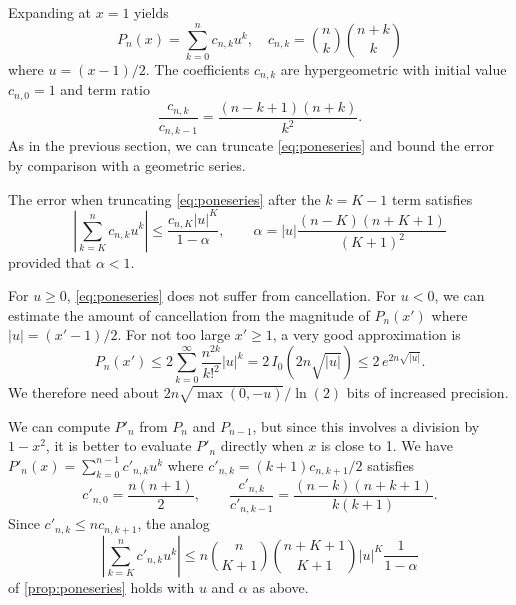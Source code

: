 \documentclass[nohypdvips,review]{siamart0216}
\begin{document}
\label{sec:series-one}

Expanding at $x = 1$ yields
\begin{equation}
\label{eq:poneseries}
P_n(x) = \sum_{k=0}^n c_{n,k} u^k, \quad c_{n,k} = {n \choose k} {n+k \choose k}
\end{equation}
where $u = (x-1)/2$.
The coefficients $c_{n,k}$ are hypergeometric with initial value $c_{n,0} = 1$
and term ratio
\begin{equation}
\label{eq:poneprec}
\frac{c_{n,k}}{c_{n,k-1}} = \frac{(n-k+1)(n+k)}{k^2}.
\end{equation}
As in the previous section, we can truncate \cref{eq:poneseries} and
bound the error by comparison with a geometric series.

\begin{proposition}
\label{prop:poneseries}
The error when truncating \cref{eq:poneseries} after the $k = K - 1$ term satisfies
\begin{equation}
\label{eq:truncerr2}
\left| \sum_{k=K}^n c_{n,k} u^k \right| \le \frac{c_{n,K} |u|^K}{1-\alpha},
\qquad \alpha = |u| \frac{(n-K)(n+K+1)}{(K+1)^2}
\end{equation}
provided that $\alpha < 1$.
\end{proposition}

For $u \ge 0$, \cref{eq:poneseries} does not suffer from cancellation.
For $u < 0$, we can estimate the amount of
cancellation from the magnitude of $P_n(x')$ where $|u| = (x'-1)/2$.
For not too large $x' \ge 1$, a very good approximation is
\[ P_n(x') \leq 2 \sum_{k=0}^{\infty} \frac{n^{2k}}{k!^2} |u|^k
           = 2\,I_0(2n\sqrt{|u|})
           \leq 2\,e^{2n\sqrt{|u|}}. \]
We therefore need about $2n\sqrt{\max(0,-u)} / \ln(2)$ bits
of increased precision.

We can compute $P'_n$ from $P_n$ and $P_{n-1}$, but since this
involves a division by $1-x^2$, it is better to
evaluate $P'_n$ directly when $x$ is close to 1.
We have
$P'_n(x) = \sum_{k=0}^{n-1} c'_{n,k} u^k$
where $c'_{n,k} = (k+1) c_{n,k+1} / 2$ satisfies
\begin{equation}
\label{eq:ponerecprime}
  c'_{n,0} = \frac{n(n+1)}{2}, \qquad
  \frac{c'_{n,k}}{c'_{n,k-1}} = \frac{(n-k)(n+k+1)}{k(k+1)}.
\end{equation}
Since $c'_{n,k} \le n c_{n,k+1}$, the analog
\begin{equation}
\label{eq:truncerr2b}
\left| \sum_{k=K}^n c'_{n,k} u^k \right| \le n {n \choose K+1}{n+K+1 \choose K+1} |u|^K \frac{1}{1-\alpha}
\end{equation}
of \cref{prop:poneseries} holds with $u$ and $\alpha$ as above.
\end{document}
